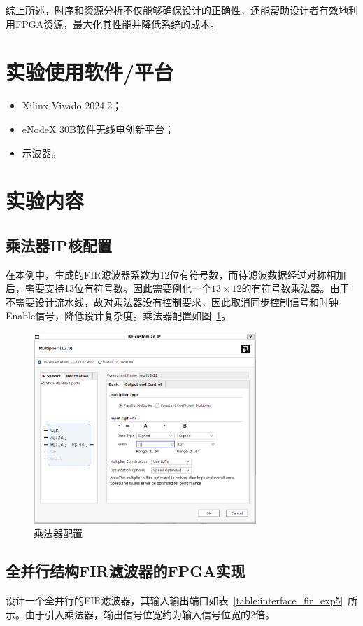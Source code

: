 综上所述，时序和资源分析不仅能够确保设计的正确性，还能帮助设计者有效地利用FPGA资源，最大化其性能并降低系统的成本。

\section{实验使用软件/平台}
\begin{itemize}
  \item Xilinx Vivado 2024.2；
  \item eNodeX 30B软件无线电创新平台；
  \item 示波器。
\end{itemize}
\section{实验内容}
\subsection{乘法器IP核配置}
在本例中，生成的FIR滤波器系数为12位有符号数，而待滤波数据经过对称相加后，需要支持13位有符号数。因此需要例化一个$13\times 12$的有符号数乘法器。由于不需要设计流水线，故对乘法器没有控制要求，因此取消同步控制信号和时钟Enable信号，降低设计复杂度。乘法器配置如图~\ref{fig:exp5:mult}。
\begin{figure}[htbp]
  \centering
  \includegraphics[width=0.75\textwidth]{figure/exp5/mult_settings.png}
  \caption{乘法器配置}
  \label{fig:exp5:mult}
\end{figure}

\subsection{全并行结构FIR滤波器的FPGA实现}
设计一个全并行的FIR滤波器，其输入输出端口如表~\ref{table:interface_fir_exp5}~所示。由于引入乘法器，输出信号位宽约为输入信号位宽的2倍。

